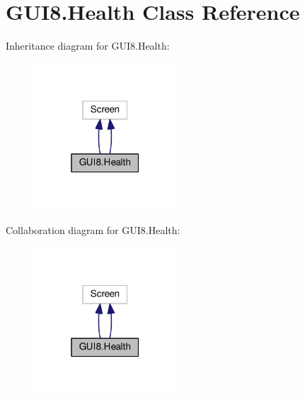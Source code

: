 \hypertarget{classGUI8_1_1Health}{}\section{G\+U\+I8.\+Health Class Reference}
\label{classGUI8_1_1Health}


Inheritance diagram for G\+U\+I8.\+Health\+:\nopagebreak
\begin{figure}[H]
\begin{center}
\leavevmode
\includegraphics[width=151pt]{classGUI8_1_1Health__inherit__graph}
\end{center}
\end{figure}


Collaboration diagram for G\+U\+I8.\+Health\+:\nopagebreak
\begin{figure}[H]
\begin{center}
\leavevmode
\includegraphics[width=151pt]{classGUI8_1_1Health__coll__graph}
\end{center}
\end{figure}
